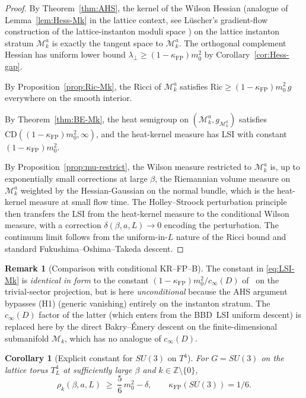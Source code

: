 \documentclass[11pt,a4paper]{amsart}
\newtheorem{corollary}[theorem]{Corollary}
\theoremstyle{definition}
\newtheorem{remark}[theorem]{Remark}
\newcommand{\Z}{\mathbb{Z}}
\newcommand{\Ric}{\mathrm{Ric}}
\newcommand{\Mmod}{\mathcal{M}}
\newcommand{\kFP}{\kappa_{\mathrm{FP}}}
\newcommand{\cinf}{c_{\infty}}
\begin{document}
\begin{proof}
By Theorem~\ref{thm:AHS}, the kernel of the Wilson Hessian (analogue of
Lemma~\ref{lem:Hess-Mk} in the lattice context, see L\"uscher's
gradient-flow construction of the lattice-instanton moduli space
\cite{Luscher2010WilsonFlow}) on the lattice instanton stratum
$\Mmod_k^a$ is exactly the tangent space to $\Mmod_k^a$. The orthogonal
complement Hessian has uniform lower bound
$\lambda_\perp \geq (1-\kFP)m_0^2$ by Corollary~\ref{cor:Hess-gap}.

By Proposition~\ref{prop:Ric-Mk}, the Ricci of $\Mmod_k^a$ satisfies
$\Ric \geq (1-\kFP)m_0^2\,g$ everywhere on the smooth interior.

By Theorem~\ref{thm:BE-Mk}, the heat semigroup on $(\Mmod_k^a,
g_{\Mmod_k^a})$ satisfies $\mathrm{CD}((1-\kFP)m_0^2,\infty)$, and the
heat-kernel measure has LSI with constant $(1-\kFP)m_0^2$.

By Proposition~\ref{prop:mu-restrict}, the Wilson measure restricted
to $\Mmod_k^a$ is, up to exponentially small corrections at large
$\beta$, the Riemannian volume measure on $\Mmod_k^a$ weighted by the
Hessian-Gaussian on the normal bundle, which is the heat-kernel measure
at small flow time. The Holley--Stroock perturbation principle then
transfers the LSI from the heat-kernel measure to the conditional
Wilson measure, with a correction $\delta(\beta,a,L) \to 0$ encoding
the perturbation. The continuum limit follows from the uniform-in-$L$
nature of the Ricci bound and standard Fukushima--Oshima--Takeda
descent.
\end{proof}

\begin{remark}[Comparison with conditional KR--FP--B]
The constant in \eqref{eq:LSI-Mk} is \emph{identical in form} to the
constant $(1-\kFP)m_0^2/\cinf(D)$ of~\cite[Thm.~6.1]{RemondiereKRFPB_2026}
on the trivial-sector projection, but is here \emph{unconditional}
because the AHS argument bypasses (H1) (generic vanishing) entirely on
the instanton stratum. The $\cinf(D)$ factor of the latter (which enters
from the BBD~LSI uniform descent) is replaced here by the direct
Bakry--\'Emery descent on the finite-dimensional submanifold $\Mmod_k$,
which has no analogue of $\cinf(D)$.
\end{remark}

\begin{corollary}[Explicit constant for $SU(3)$ on $T^4$]\label{cor:SU3}
For $G = SU(3)$ on the lattice torus $T^4_L$ at sufficiently large
$\beta$ and $k\in\Z\setminus\{0\}$,
$$
\rho_k(\beta, a, L) \;\geq\; \frac{5}{6}\,m_0^2 - \delta,
\qquad \kFP(SU(3)) = 1/6.
$$
\end{corollary}
\end{document}
